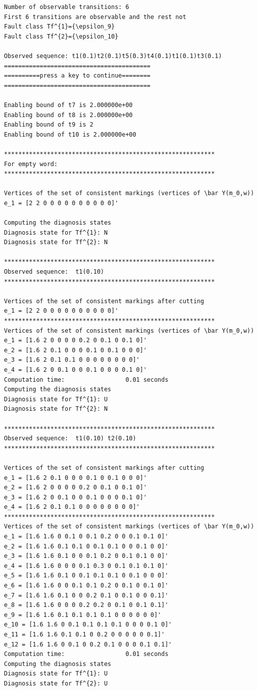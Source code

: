 \begin{verbatim}
Number of observable transitions: 6 
First 6 transitions are observable and the rest not
Fault class Tf^{1}={\epsilon_9}
Fault class Tf^{2}={\epsilon_10}

Observed sequence: t1(0.1)t2(0.1)t5(0.3)t4(0.1)t1(0.1)t3(0.1) 
=========================================
==========press a key to continue========
=========================================

Enabling bound of t7 is 2.000000e+00
Enabling bound of t8 is 2.000000e+00
Enabling bound of t9 is 2
Enabling bound of t10 is 2.000000e+00

***********************************************************
For empty word:
***********************************************************

Vertices of the set of consistent markings (vertices of \bar Y(m_0,w))
e_1 = [2 2 0 0 0 0 0 0 0 0 0 0]'

Computing the diagnosis states
Diagnosis state for Tf^{1}: N
Diagnosis state for Tf^{2}: N

***********************************************************
Observed sequence:  t1(0.10)
***********************************************************

Vertices of the set of consistent markings after cutting
e_1 = [2 2 0 0 0 0 0 0 0 0 0 0]'
***********************************************************
Vertices of the set of consistent markings (vertices of \bar Y(m_0,w))
e_1 = [1.6 2 0 0 0 0 0.2 0 0.1 0 0.1 0]'
e_2 = [1.6 2 0.1 0 0 0 0.1 0 0.1 0 0 0]'
e_3 = [1.6 2 0.1 0.1 0 0 0 0 0 0 0 0]'
e_4 = [1.6 2 0 0.1 0 0 0.1 0 0 0 0.1 0]'
Computation time:                 0.01 seconds
Computing the diagnosis states
Diagnosis state for Tf^{1}: U
Diagnosis state for Tf^{2}: N

***********************************************************
Observed sequence:  t1(0.10) t2(0.10)
***********************************************************

Vertices of the set of consistent markings after cutting
e_1 = [1.6 2 0.1 0 0 0 0.1 0 0.1 0 0 0]'
e_2 = [1.6 2 0 0 0 0 0.2 0 0.1 0 0.1 0]'
e_3 = [1.6 2 0 0.1 0 0 0.1 0 0 0 0.1 0]'
e_4 = [1.6 2 0.1 0.1 0 0 0 0 0 0 0 0]'
***********************************************************
Vertices of the set of consistent markings (vertices of \bar Y(m_0,w))
e_1 = [1.6 1.6 0 0.1 0 0.1 0.2 0 0 0.1 0.1 0]'
e_2 = [1.6 1.6 0.1 0.1 0 0.1 0.1 0 0 0.1 0 0]'
e_3 = [1.6 1.6 0.1 0 0 0.1 0.2 0 0.1 0.1 0 0]'
e_4 = [1.6 1.6 0 0 0 0.1 0.3 0 0.1 0.1 0.1 0]'
e_5 = [1.6 1.6 0.1 0 0.1 0.1 0.1 0 0.1 0 0 0]'
e_6 = [1.6 1.6 0 0 0.1 0.1 0.2 0 0.1 0 0.1 0]'
e_7 = [1.6 1.6 0.1 0 0 0.2 0.1 0 0.1 0 0 0.1]'
e_8 = [1.6 1.6 0 0 0 0.2 0.2 0 0.1 0 0.1 0.1]'
e_9 = [1.6 1.6 0.1 0.1 0.1 0.1 0 0 0 0 0 0]'
e_10 = [1.6 1.6 0 0.1 0.1 0.1 0.1 0 0 0 0.1 0]'
e_11 = [1.6 1.6 0.1 0.1 0 0.2 0 0 0 0 0 0.1]'
e_12 = [1.6 1.6 0 0.1 0 0.2 0.1 0 0 0 0.1 0.1]'
Computation time:                 0.01 seconds
Computing the diagnosis states
Diagnosis state for Tf^{1}: U
Diagnosis state for Tf^{2}: U


\end{verbatim}

